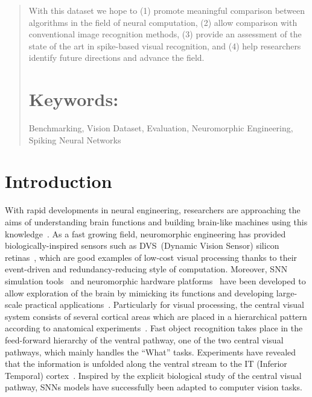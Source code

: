 \documentclass{frontiersENG} %
\begin{document}
\begin{abstract}
With this dataset we hope to (1) promote meaningful comparison between algorithms in the field of neural computation, (2) allow comparison with conventional image recognition methods, (3) provide an assessment of the state of the art in spike-based visual recognition, and (4) help researchers identify future directions and advance the field.

\tiny
\section{Keywords:} Benchmarking, Vision Dataset, Evaluation, Neuromorphic Engineering, Spiking Neural Networks
\end{abstract}

\section{Introduction}
\label{sec:intro}
With rapid developments in neural engineering, researchers are approaching the aims of understanding brain functions and building brain-like machines using this knowledge~\citep{furber2007neural}.
As a fast growing field, neuromorphic engineering has provided biologically-inspired sensors such as DVS~(Dynamic Vision Sensor) silicon retinas~\citep{serrano2013128, delbruck2008frame, yang2015dynamic, posch2014retinomorphic}, which are good examples of low-cost visual processing thanks to their event-driven and redundancy-reducing style of computation.
Moreover, SNN simulation tools~\citep{davison2008pynn, gewaltig2007nest, goodman2008brian} and neuromorphic hardware platforms~\citep{furber2014spinnaker,  schemmel2010wafer, merolla2014million} have been developed to allow exploration of the brain by mimicking its functions and developing large-scale practical applications~\citep{eliasmith2012large}.
Particularly for visual processing, the central visual system consists of several cortical areas which are placed in a hierarchical pattern according to anatomical experiments~\citep{felleman1991distributed}.
Fast object recognition takes place in  the feed-forward hierarchy of the ventral pathway, one of the two central visual pathways, which mainly handles the ``What'' tasks.
Experiments have revealed that the information is unfolded along the ventral stream to the  IT (Inferior Temporal) cortex~\citep{dicarlo2012does}.
Inspired by the  explicit  biological study of the central visual pathway, SNNs models have successfully been adapted to computer vision tasks.  
\end{document}
